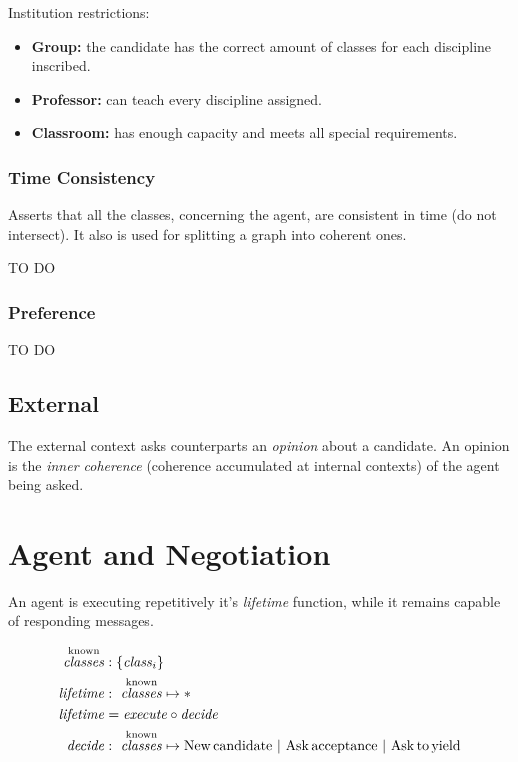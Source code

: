 \documentclass{article}
\begin{document}
Institution restrictions:
\begin{itemize}
\item \textbf{Group:} the candidate has the correct amount of classes for each
  discipline inscribed.
\item \textbf{Professor:} can teach every discipline assigned.
\item \textbf{Classroom:} has enough capacity and meets all special requirements.
\end{itemize}


\subsubsection{Time Consistency}

Asserts that all the classes, concerning the agent, are consistent in time
(do not intersect). It also is used for splitting a graph into coherent ones.

TO DO

\subsubsection{Preference}

TO DO

\subsection{External}

The external context asks counterparts an \emph{opinion} about a candidate.
An opinion is the \emph{inner coherence} (coherence accumulated at internal
contexts) of the agent being asked.



\section{Agent and Negotiation}

An agent is executing repetitively it's \emph{lifetime} function, while it remains
capable of responding messages.

\begin{align*}
  \overset{\mathrm{known}}{\mathit{classes}} &: \{\mathit{class}_i\} \\
  \mathit{lifetime} &:~ \overset{\mathrm{known}}{\mathit{classes}} \mapsto * \\
  \mathit{lifetime} &=  \mathit{execute} \circ \mathit{decide} \\
  \mathit{decide}   &:~ \overset{\mathrm{known}}{\mathit{classes}} \mapsto
              \mathrm{New\,candidate} ~|~
              \mathrm{Ask\,acceptance} ~|~
              \mathrm{Ask\,to\,yield}
\end{align*}
\end{document}
